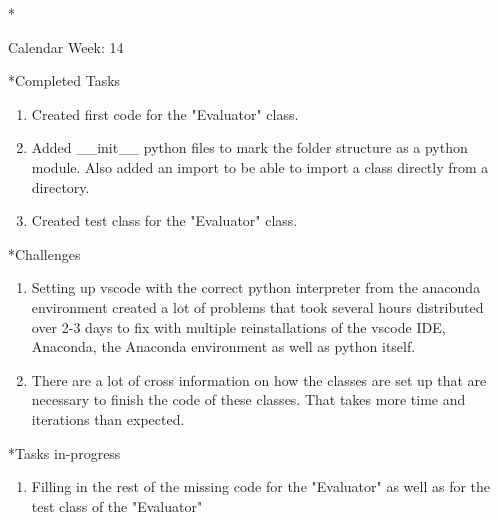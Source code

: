 \documentclass[11pt,a4paper]{article}
\begin{document}
\newpage
\begin{section}*{Calendar Week: 14 \hfill \date{09 April, 2021}}
	
	\begin{subsection}*{Completed Tasks}
		\begin{enumerate}
			\item Created first code for the "Evaluator" class.
			\item Added \_\_init\_\_ python files to mark the folder structure as a python module. Also added an import to be able to import a class directly from a directory.
			\item Created test class for the "Evaluator" class.
		\end{enumerate}
	\end{subsection}
	
	\begin{subsection}*{Challenges}
		\begin{enumerate}
			\item Setting up vscode with the correct python interpreter from the anaconda environment created a lot of problems that took several hours distributed over 2-3 days to fix with multiple reinstallations of the vscode IDE, Anaconda, the Anaconda environment as well as python itself.
			\item There are a lot of cross information on how the classes are set up that are necessary to finish the code of these classes. That takes more time and iterations than expected.
		\end{enumerate}
	\end{subsection}
	
	\begin{subsection}*{Tasks in-progress}
		\begin{enumerate}
			\item Filling in the rest of the missing code for the "Evaluator" as well as for the test class of the "Evaluator"
		\end{enumerate}
	\end{subsection}
	
\end{section}
\end{document}
